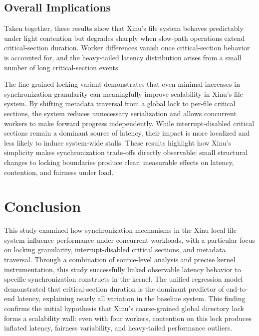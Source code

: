 \documentclass[sigconf]{acmart}
\begin{document}
\subsection{Overall Implications}  
Taken together, these results show that Xinu’s file system behaves predictably under light contention but degrades sharply when slow-path operations extend critical-section duration. Worker differences vanish once critical-section behavior is accounted for, and the heavy-tailed latency distribution arises from a small number of long critical-section events. 

The fine-grained locking variant demonstrates that even minimal increases in synchronization granularity can meaningfully improve scalability in Xinu's file system. By shifting metadata traversal from a global lock to per-file critical sections, the system reduces unnecessary serialization and allows concurrent workers to make forward progress independently. While interrupt-disabled critical sections remain a dominant source of latency, their impact
is more localized and less likely to induce system-wide stalls. These results highlight how Xinu's simplicity makes synchronization trade-offs directly observable: small structural changes to locking boundaries produce clear, measurable effects on latency, contention, and fairness under load.






\section{Conclusion}

This study examined how synchronization mechanisms in the Xinu local file system influence performance under concurrent workloads, with a particular focus on locking granularity, interrupt-disabled critical sections, and metadata traversal. Through a combination of source-level analysis and precise kernel instrumentation, this study successfully linked observable latency behavior to specific synchronization constructs in the kernel. The unified regression model demonstrated that critical-section duration is the dominant predictor of end-to-end latency, explaining nearly all variation in the baseline system. This finding confirms the initial hypothesis that Xinu’s coarse-grained global directory lock forms a scalability wall: even with four workers, contention on this lock produces inflated latency, fairness variability, and heavy-tailed performance outliers.
\end{document}
